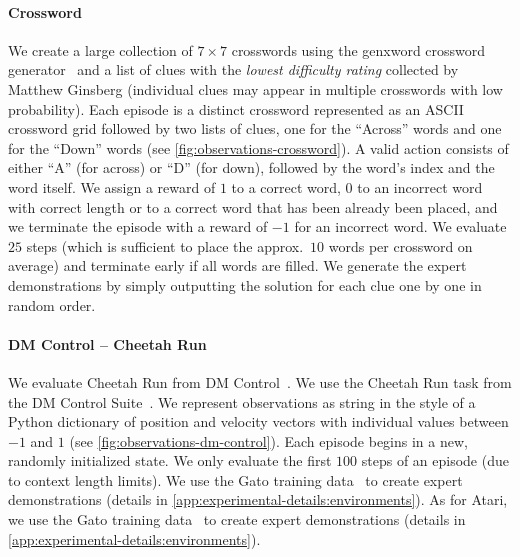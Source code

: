 \documentclass{article}
\begin{document}
\paragraph{Crossword}
We create a large collection of $7\times7$ crosswords using the genxword crossword generator~\citep{whitlock2011genxword} and a list of  clues with the \emph{lowest difficulty rating} collected by Matthew Ginsberg (individual clues may appear in multiple crosswords with low probability).
Each episode is a distinct crossword represented as an ASCII crossword grid followed by two lists of clues, one for the ``Across'' words and one for the ``Down'' words (see \cref{fig:observations-crossword}).
A valid action consists of either ``A'' (for across) or ``D'' (for down), followed by the word's index and the word itself.
We assign a reward of $1$ to a correct word, $0$ to an incorrect word with correct length or to a correct word that has been already been placed, and we terminate the episode with a reward of $-1$ for an incorrect word.
We evaluate $25$ steps (which is sufficient to place the approx.\ $10$ words per crossword on average) and terminate early if all words are filled.
We generate the expert demonstrations by simply outputting the solution for each clue one by one in random order.
\paragraph{DM Control -- Cheetah Run}
\ificlr
We evaluate Cheetah Run from DM Control~\citep{tassa2018deepmind}.
\else
We use the Cheetah Run task from the DM Control Suite~\citep{tassa2018deepmind}.
\fi
We represent observations as string in the style of a Python dictionary of position and velocity vectors with individual values between $-1$ and $1$ (see \cref{fig:observations-dm-control}).
Each episode begins in a new, randomly initialized state.
We only evaluate the first $100$ steps of an episode (due to context length limits).
\ificlr
We use the Gato training data~\citep{reed2022generalist} to create expert demonstrations (details in \cref{app:experimental-details:environments}).
\else
As for Atari, we use the Gato training data~\citep{reed2022generalist} to create expert demonstrations (details in \cref{app:experimental-details:environments}).
\fi
\end{document}
